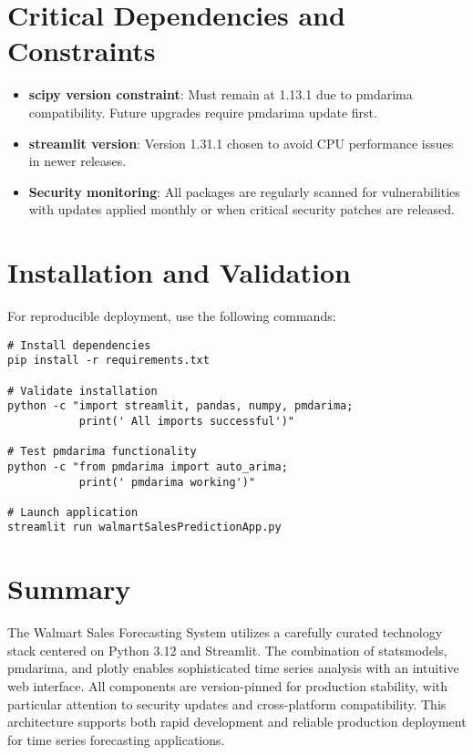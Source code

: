 \section*{Critical Dependencies and Constraints}

\begin{itemize}
	\item \textbf{scipy version constraint}: Must remain at 1.13.1 due to pmdarima compatibility. Future upgrades require pmdarima update first.
	
	\item \textbf{streamlit version}: Version 1.31.1 chosen to avoid CPU performance issues in newer releases.
	
	\item \textbf{Security monitoring}: All packages are regularly scanned for vulnerabilities with updates applied monthly or when critical security patches are released.
\end{itemize}

\section*{Installation and Validation}

For reproducible deployment, use the following commands:

\begin{verbatim}
# Install dependencies
pip install -r requirements.txt

# Validate installation
python -c "import streamlit, pandas, numpy, pmdarima; 
           print(' All imports successful')"

# Test pmdarima functionality
python -c "from pmdarima import auto_arima; 
           print(' pmdarima working')"

# Launch application
streamlit run walmartSalesPredictionApp.py
\end{verbatim}

\section*{Summary}

The Walmart Sales Forecasting System utilizes a carefully curated technology stack centered on Python 3.12 and Streamlit. The combination of statsmodels, pmdarima, and plotly enables sophisticated time series analysis with an intuitive web interface. All components are version-pinned for production stability, with particular attention to security updates and cross-platform compatibility. This architecture supports both rapid development and reliable production deployment for time series forecasting applications.